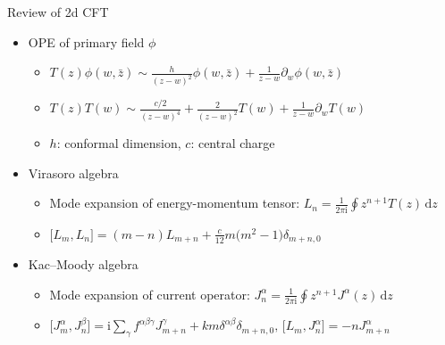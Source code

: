 \documentclass{fdubeamer}
\newcommand{\dd}{\mathrm{d}}
\newcommand{\ii}{\mathrm{i}}
\newcommand{\1}{\mathbb{1}}
\begin{document}
\begin{frame}{Review of 2d CFT}

\linespread{1.4}
\selectfont

\begin{itemize}
  \item OPE of primary field $\phi$

    \begin{itemize}
      \item $T(z) \phi(w,\bar{z}) \sim \frac{h}{(z-w)^2} \phi(w,\bar{z}) + \frac{1}{z-w} \partial_w\phi(w,\bar{z})$
      \item $T(z) T(w) \sim \frac{c/2}{(z-w)^4} + \frac{2}{(z-w)^2} T(w) + \frac{1}{z-w} \partial_w T(w)$
      \item $h$: conformal dimension, $c$: central charge
    \end{itemize}

  \item Virasoro algebra

    \begin{itemize}
      \item Mode expansion of energy-momentum tensor: $L_n  = \frac{1}{2\pi\ii} \oint z^{n+1} T(z) \, \dd z$
      \item $\bigl[ L_m, L_n \bigr] = (m-n) L_{m+n} + \frac{c}{12} m \bigl( m^2-1 \bigr) \delta_{m+n,0}$
    \end{itemize}

  \item Kac--Moody algebra

    \begin{itemize}
      \item Mode expansion of current operator: $J^\alpha_n = \frac{1}{2\pi\ii} \oint z^{n+1} J^\alpha(z) \, \dd z$
      \item $
          \bigl[ J^\alpha_m, J^\beta_n \bigr] = \ii \sum_\gamma f^{\alpha\beta\gamma} J^\gamma_{m+n} + km \delta^{\alpha\beta} \delta_{m+n,0}, \,
          \bigl[ L_m, J^\alpha_n \bigr] = -n J^\alpha_{m+n}
        $
    \end{itemize}
\end{itemize}

\end{frame}
\end{document}
